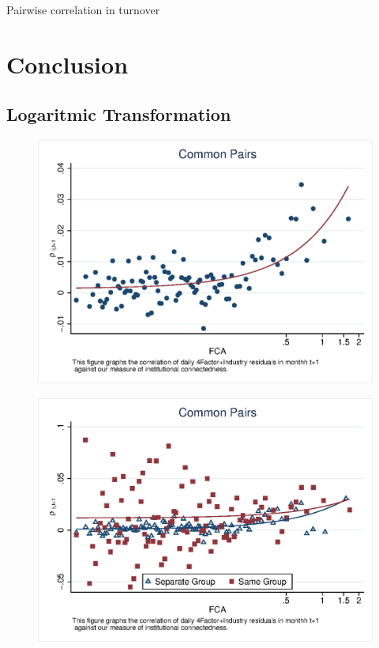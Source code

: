\documentclass[12pt, a4paper]{article}
\begin{document}
\begin{table}[htbp]
	\centering
		\caption{Pairwise correlation in turnover  }
	\resizebox{0.7\textheight}{!}{
		\centering
		
	}
\end{table}


\FloatBarrier
\section{Conclusion}


\begin{appendices}
\section{Logaritmic Transformation}



 \begin{figure}
 \centering  
\includegraphics[width=0.8\linewidth]{"mcorr50.eps"}
\end{figure}

  \begin{figure}   
 \centering
\includegraphics[width=0.8\linewidth]{"mcorr50bg.eps"}     \end{figure}            



\end{appendices}
\end{document}
